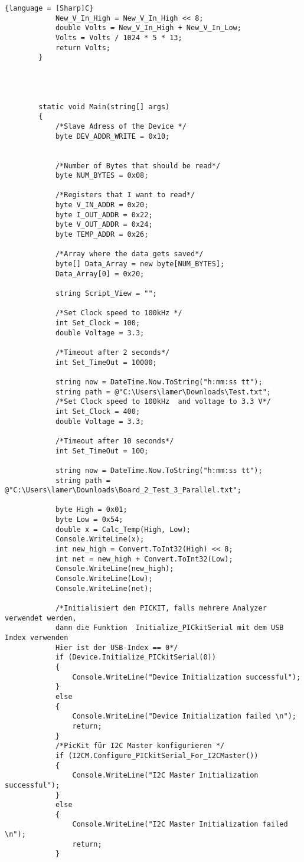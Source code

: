 \begin{lstlisting}{language = [Sharp]C}
            New_V_In_High = New_V_In_High << 8;
            double Volts = New_V_In_High + New_V_In_Low;
            Volts = Volts / 1024 * 5 * 13;
            return Volts;
        }




        static void Main(string[] args)
        {
            /*Slave Adress of the Device */
            byte DEV_ADDR_WRITE = 0x10;


            /*Number of Bytes that should be read*/
            byte NUM_BYTES = 0x08;

            /*Registers that I want to read*/
            byte V_IN_ADDR = 0x20;
            byte I_OUT_ADDR = 0x22;
            byte V_OUT_ADDR = 0x24;
            byte TEMP_ADDR = 0x26;

            /*Array where the data gets saved*/
            byte[] Data_Array = new byte[NUM_BYTES];
            Data_Array[0] = 0x20;

            string Script_View = "";

            /*Set Clock speed to 100kHz */
            int Set_Clock = 100;
            double Voltage = 3.3;

            /*Timeout after 2 seconds*/
            int Set_TimeOut = 10000;

            string now = DateTime.Now.ToString("h:mm:ss tt");
            string path = @"C:\Users\lamer\Downloads\Test.txt";
            /*Set Clock speed to 100kHz  and voltage to 3.3 V*/
            int Set_Clock = 400;
            double Voltage = 3.3;

            /*Timeout after 10 seconds*/
            int Set_TimeOut = 100;
       
            string now = DateTime.Now.ToString("h:mm:ss tt");
            string path = @"C:\Users\lamer\Downloads\Board_2_Test_3_Parallel.txt";

            byte High = 0x01;
            byte Low = 0x54;
            double x = Calc_Temp(High, Low);
            Console.WriteLine(x);
            int new_high = Convert.ToInt32(High) << 8;
            int net = new_high + Convert.ToInt32(Low);
            Console.WriteLine(new_high);
            Console.WriteLine(Low);
            Console.WriteLine(net);

            /*Initialisiert den PICKIT, falls mehrere Analyzer verwendet werden, 
            dann die Funktion  Initialize_PICkitSerial mit dem USB Index verwenden 
            Hier ist der USB-Index == 0*/
            if (Device.Initialize_PICkitSerial(0))
            {
                Console.WriteLine("Device Initialization successful");
            }
            else
            {
                Console.WriteLine("Device Initialization failed \n");
                return;
            }
            /*PicKit für I2C Master konfigurieren */
            if (I2CM.Configure_PICkitSerial_For_I2CMaster())
            {
                Console.WriteLine("I2C Master Initialization successful");
            }
            else
            {
                Console.WriteLine("I2C Master Initialization failed \n");
                return;
            }


\end{lstlisting}
